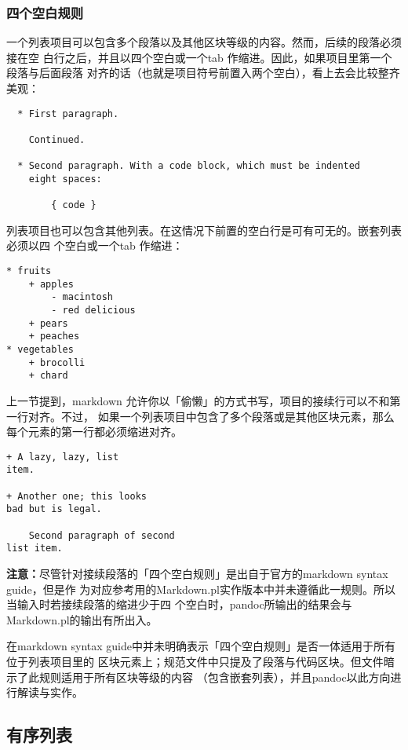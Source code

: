 \documentclass[cn]{elegantbook}
\begin{document}
\hypertarget{ux56dbux4e2aux7a7aux767dux89c4ux5219}{%
\subsubsection{四个空白规则}\label{ux56dbux4e2aux7a7aux767dux89c4ux5219}}

一个列表项目可以包含多个段落以及其他区块等级的内容。然而，后续的段落必须接在空
白行之后，并且以四个空白或一个tab
作缩进。因此，如果项目里第一个段落与后面段落
对齐的话（也就是项目符号前置入两个空白），看上去会比较整齐美观：

\begin{lstlisting}
  * First paragraph.

    Continued.

  * Second paragraph. With a code block, which must be indented
    eight spaces:

        { code }
\end{lstlisting}

列表项目也可以包含其他列表。在这情况下前置的空白行是可有可无的。嵌套列表必须以四
个空白或一个tab 作缩进：

\begin{lstlisting}
* fruits
    + apples
        - macintosh
        - red delicious
    + pears
    + peaches
* vegetables
    + brocolli
    + chard
\end{lstlisting}

上一节提到，markdown
允许你以「偷懒」的方式书写，项目的接续行可以不和第一行对齐。不过，
如果一个列表项目中包含了多个段落或是其他区块元素，那么每个元素的第一行都必须缩进对齐。

\begin{lstlisting}
+ A lazy, lazy, list
item.

+ Another one; this looks
bad but is legal.

    Second paragraph of second
list item.
\end{lstlisting}

\textbf{注意：}尽管针对接续段落的「四个空白规则」是出自于官方的markdown
syntax guide，但是作
为对应参考用的Markdown.pl实作版本中并未遵循此一规则。所以当输入时若接续段落的缩进少于四
个空白时，pandoc所输出的结果会与Markdown.pl的输出有所出入。

在markdown syntax
guide中并未明确表示「四个空白规则」是否一体适用于所有位于列表项目里的
区块元素上；规范文件中只提及了段落与代码区块。但文件暗示了此规则适用于所有区块等级的内容
（包含嵌套列表），并且pandoc以此方向进行解读与实作。

\hypertarget{ux6709ux5e8fux5217ux8868}{%
\subsection{有序列表}\label{ux6709ux5e8fux5217ux8868}}
\end{document}
